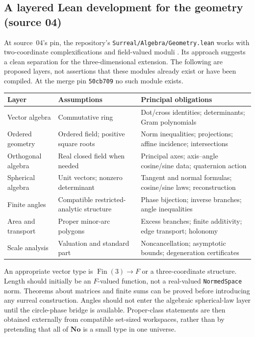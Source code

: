 \documentclass[11pt,letterpaper]{article}
\numberwithin{equation}{section}
\theoremstyle{definition}
\theoremstyle{remark}
\newcommand{\No}{\mathbf{No}}
\begin{document}
\subsection{A layered Lean development for the geometry (source 04)}\label{e3:sub:lean04}

At source~04's pin, the repository's \texttt{Surreal/Algebra/Geometry.lean}
works with two-coordinate complexifications and field-valued moduli
\cite{RepoGeometry}. Its approach suggests a clean separation for the
three-dimensional extension. The following are proposed layers, not
assertions that these modules already exist or have been compiled. At the
merge pin \texttt{50cb709} no such module exists.

\begin{center}\small
\begin{tabular}{L{0.22\textwidth}L{0.30\textwidth}L{0.39\textwidth}}
\toprule
Layer & Assumptions & Principal obligations\\
\midrule
Vector algebra & Commutative ring & Dot/cross identities; determinants; Gram polynomials\\
Ordered geometry & Ordered field; positive square roots & Norm inequalities; projections; affine incidence; intersections\\
Orthogonal algebra & Real closed field when needed & Principal axes; axis--angle cosine/sine data; quaternion action\\
Spherical algebra & Unit vectors; nonzero determinant & Tangent and normal formulas; cosine/sine laws; reconstruction\\
Finite angles & Compatible restricted-analytic structure & Phase bijection; inverse branches; angle inequalities\\
Area and transport & Proper minor-arc polygons & Excess branches; finite additivity; edge transport; holonomy\\
Scale analysis & Valuation and standard part & Noncancellation; asymptotic bounds; degeneration certificates\\
\bottomrule
\end{tabular}
\end{center}

An appropriate vector type is $\operatorname{Fin}(3)\to F$ or a
three-coordinate structure. Length should initially be an $F$-valued
function, not a real-valued \texttt{NormedSpace} norm. Theorems about
matrices and finite sums can be proved before introducing any surreal
construction. Angles should not enter the algebraic spherical-law layer
until the circle-phase bridge is available. Proper-class statements are
then obtained externally from compatible set-sized workspaces, rather
than by pretending that all of $\No$ is a small type in one universe.
\end{document}
